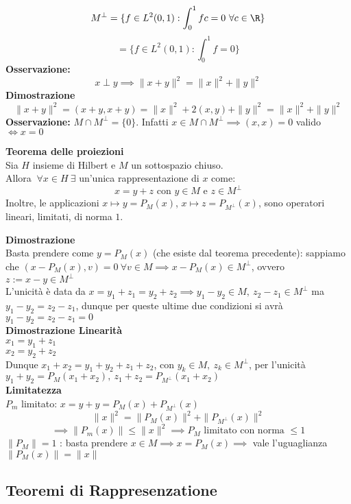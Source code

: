 \[M^{\perp}=\{f\in L^{2}(0,1): \int_{0}^{1} fc=0\ \forall c\in \R \} \]
\[=\{f\in L^{2}(0,1): \int_{0}^{1} f=0 \} \]
\textbf{Osservazione:} 
\[x\perp y\implies \|x+y\|^2=\|x\|^2+\|y\|^2\]
\textbf{Dimostrazione}
\[\|x+y\|^2=(x+y,x+y)=\|x\|^2+2(x,y)+\|y\|^2=\|x\|^2+\|y\|^2\]
\textbf{Osservazione: }$M\cap M^\perp=\{0\} $. Infatti $x\in M\cap M^\perp\implies (x,x)=0$ valido $\iff x=0$
\begin{tcolorbox}
\textbf{Teorema delle proiezioni}
\\Sia $H$ insieme di Hilbert e $M$ un sottospazio chiuso.
\\Allora $\ \forall x\in H\ \exists $ un'unica rappresentazione di $x$ come:
\[x=y+z\text{ con }y\in M\text{ e }z\in M^\perp\]
Inoltre, le applicazioni $x\mapsto y=P_M(x)$, $x\mapsto z=P_{M^\perp}(x)$, sono operatori lineari, limitati, di norma $1$.
\end{tcolorbox}
\textbf{Dimostrazione} 
\\Basta prendere come $y=P_M(x)$ (che esiste dal teorema precedente): sappiamo che $(x-P_M(x),v)=0\ \forall v\in M\implies x-P_M(x)\in M^\perp$, ovvero $z:=x-y\in M^\perp$
\\L'unicità è data da $x=y_1+z_1=y_2+z_2\implies y_1-y_2 \in M, \ z_2-z_1\in M^\perp$ ma $y_1-y_2=z_2-z_1$, dunque per queste ultime due condizioni si avrà $y_1-y_2=z_2-z_1=0$
\\\textbf{Dimostrazione Linearità} 
\\$x_1=y_1+z_1$ 
\\$x_2=y_2+z_2$
\\Dunque $x_1+x_2=y_1+y_2+z_1+z_2$, con $y_k\in M,\ z_k\in M^\perp$, per l'unicità $y_1+y_2=P_M(x_1+x_2),\ z_1+z_2=P_{M^\perp}(x_1+x_2)$
\\\textbf{Limitatezza}\\
$P_m$ limitato: $x=y+y=P_M(x)+P_{M^\perp}(x)$
\[\|x\|^2=\|P_M(x)\|^2+\|P_{M^\perp}(x)\|^2\]\[\implies \|P_m(x)\|\le \|x\|^2\implies P_M\text{ limitato con norma }\le 1\]
$\|P_M\|=1$ : basta prendere $x\in M\implies x=P_M(x)\implies $ vale l'uguaglianza $\|P_M(x)\|=\|x\|$
\subsection{Teoremi di Rappresenzatione}
